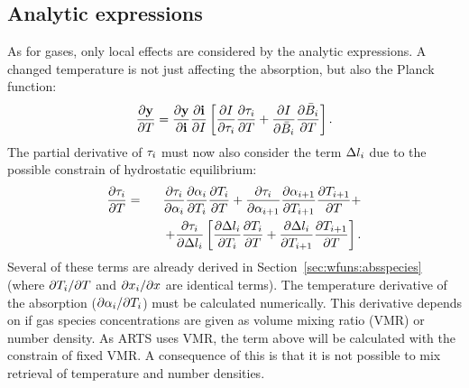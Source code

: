 \subsection{Analytic expressions}
%
As for gases, only local effects are considered by the analytic expressions.
A changed temperature is not just affecting the absorption, but also the Planck
function:
\begin{equation}
  \frac{\partial \mathbf{y}}{\partial T} =  
  \frac{\partial \mathbf{y}}{\partial \mathbf{i}} \frac{\partial \mathbf{i}}{\partial I} 
  \left[
  \frac{\partial I}{\partial \tau_{i}}\frac{\partial \tau_{i}}{\partial T} + 
  \frac{\partial I}{\partial \bar{B}_i}
  \frac{\partial \bar{B}_i}{\partial T} \right].
 \label{eq:wfuns:t1}
\end{equation}
The partial derivative of $\tau_{i}$ must now also consider the term $\Delta
l_{i}$ due to the possible constrain of hydrostatic equilibrium:
\begin{eqnarray}
  \frac{\partial \tau_{i}}{\partial T} &=&
  \frac{\partial \tau_{i}}{\partial {\alpha}_{i}}
  \frac{\partial {\alpha}_{i}}{\partial T_{i}} 
  \frac{\partial T_{i}}{\partial T} +
  \frac{\partial \tau_{i}}{\partial {\alpha}_{i+1}}
  \frac{\partial {\alpha}_{i+1}}{\partial T_{i+1}}
  \frac{\partial T_{i+1}}{\partial T} + \nonumber \\ &&
  \quad + \frac{\partial \tau_{i}}{\partial \Delta l_{i}}
  \left[
    \frac{\partial \Delta l_{i}}{\partial T_{i}} \frac{\partial T_i}{\partial T} +
    \frac{\partial \Delta l_{i}}{\partial T_{i+1}} \frac{\partial T_{i+1}}{\partial T}
  \right].
\end{eqnarray}
Several of these terms are already derived in
Section~\ref{sec:wfuns:absspecies} (where $\partial T_{i}/\partial T$ and
$\partial x_{i}/\partial x$ are identical terms). The temperature
derivative of the absorption ($\partial{\alpha}_{i}/\partial T_{i}$) must be
calculated numerically. This derivative depends on if gas species
concentrations are given as volume mixing ratio (VMR) or number density. As
ARTS uses VMR, the term above will be calculated with the constrain of fixed
VMR. A consequence of this is that it is not possible to mix retrieval of
temperature and number densities.

